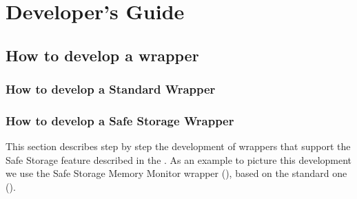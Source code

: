 \graphicspath{{chapters/ch-developer-guide/figures/}}

\chapter{Developer's Guide}

\section{How to develop a wrapper}

\subsection{How to develop a Standard Wrapper}

\subsection{How to develop a Safe Storage Wrapper}

This section describes step by step the development of wrappers that support the Safe Storage feature described in the .
As an example to picture this development we use the Safe Storage Memory Monitor wrapper (), based on the 
standard one ().

